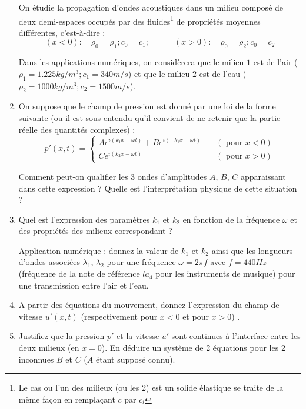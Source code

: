 \documentclass[10pt, a4paper]{article}
\begin{document}
\begin{enumerate}
On étudie la propagation d'ondes acoustiques dans un milieu composé de deux demi-espaces occupés par des fluides\footnote{Le cas ou l'un des milieux (ou les 2) est un solide élastique se traite de la même façon en remplaçant $c$ par $c_l$} de propriétés moyennes différentes, c'est-à-dire :
$$
(x<0 ) : \quad \rho_0 = \rho_1 ; c_0 = c_1 ; \quad \qquad (x>0 ) : \quad  \rho_0 = \rho_2 ; c_0 = c_2
$$

Dans les applications numériques, on considèrera que le milieu $1$ est de l'air ($\rho_1 = 1.225 kg/m^3 ; c_1 = 340 m/s$) et que le milieu $2$ est de l'eau 
($\rho_2 = 1000 kg/m^3 ; c_2 = 1500 m/s$).


 \item 
On suppose que le champ de pression est donné par une loi de la forme suivante (ou il est sous-entendu qu'il convient de ne retenir que la partie réelle des quantités complexes) :
\begin{equation}
p'(x,t) = \left\{ \begin{array}{ll} 
A e^{i (k_1 x - \omega t)} + B e^{i (-k_1 x - \omega t)} & \quad ( \mbox{ pour }  x<0) \\
C e^{i (k_2 x - \omega t)} & \quad ( \mbox{ pour }  x>0) 
\end{array}
\right.
\label{eq:ABC}
\end{equation}

Comment peut-on qualifier les 3 ondes d'amplitudes $A$, $B$, $C$ apparaissant dans cette expression ? Quelle est l'interprétation physique de cette situation ?

\item Quel est l'expression des paramètres $k_1$ et $k_2$ en fonction de la fréquence $\omega$ et des propriétés des milieux correspondant ?

Application numérique : donnez la valeur de $k_1$ et $k_2$ ainsi que les longueurs d'ondes associées $\lambda_1$, $\lambda_2$ pour une fréquence $\omega = 2 \pi f $ avec $f = 440 Hz$ (fréquence de la note de référence $la_4$ pour les instruments de musique) pour une transmission entre l'air et l'eau. 

\item
A partir des équations du mouvement, donnez l'expression du champ de vitesse $u'(x,t)$ (respectivement pour $x<0$ et pour $x>0$) .

\item 
Justifiez que la pression $p'$ et la vitesse $u'$ sont continues à l'interface entre les deux milieux 
(en $x=0$). En déduire un système de 2 équations pour les 2 inconnues $B$ et $C$ ($A$ étant supposé connu).


\end{enumerate}
\end{document}
